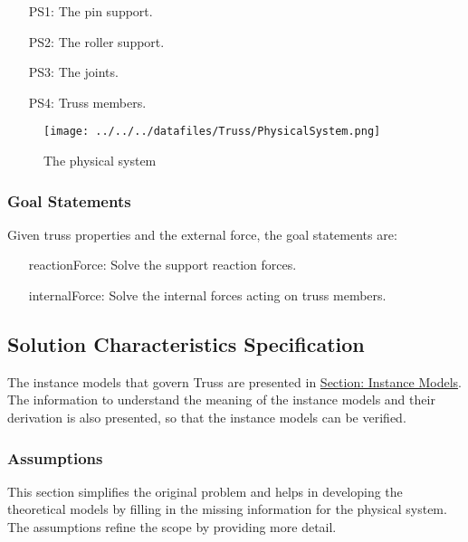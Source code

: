 \documentclass[12pt]{article}
\begin{document}
\begin{itemize}
\item[PS1:]{The pin support.}
\item[PS2:]{The roller support.}
\item[PS3:]{The joints.}
\item[PS4:]{Truss members.}
\end{itemize}
\begin{figure}
\begin{center}
\texttt{[image: ../../../datafiles/Truss/PhysicalSystem.png]}
\caption{The physical system}
\label{Figure:physSysImage}
\end{center}
\end{figure}
\subsubsection{Goal Statements}
\label{Sec:GoalStmt}
Given truss properties and the external force, the goal statements are:

\begin{itemize}
\item[reactionForce:\phantomsection\label{reactionForce}]{Solve the support reaction forces.}
\item[internalForce:\phantomsection\label{internalForce}]{Solve the internal forces acting on truss members.}
\end{itemize}
\subsection{Solution Characteristics Specification}
\label{Sec:SolCharSpec}
The instance models that govern Truss are presented in \hyperref[Sec:IMs]{Section: Instance Models}. The information to understand the meaning of the instance models and their derivation is also presented, so that the instance models can be verified.

\subsubsection{Assumptions}
\label{Sec:Assumps}
This section simplifies the original problem and helps in developing the theoretical models by filling in the missing information for the physical system. The assumptions refine the scope by providing more detail.
\end{document}
